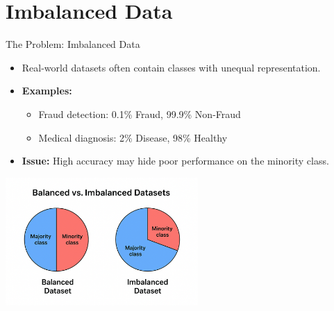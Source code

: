 \documentclass[serif, aspectratio=169]{beamer}
\begin{document}
\section{Imbalanced Data}

\begin{frame}{The Problem: Imbalanced Data}
    \begin{itemize}\itemsep1em
        \item Real-world datasets often contain classes with unequal representation.
        \item \textbf{Examples:}
        \begin{itemize}
            \item Fraud detection: 0.1\% Fraud, 99.9\% Non-Fraud
            \item Medical diagnosis: 2\% Disease, 98\% Healthy
        \end{itemize}
        \item \textbf{Issue:} High accuracy may hide poor performance on the minority class.
    \end{itemize}
    \begin{center}
        \includegraphics[width=0.55\textwidth]{pic/figure_32.png}\\
    \end{center}
\end{frame}
\end{document}
